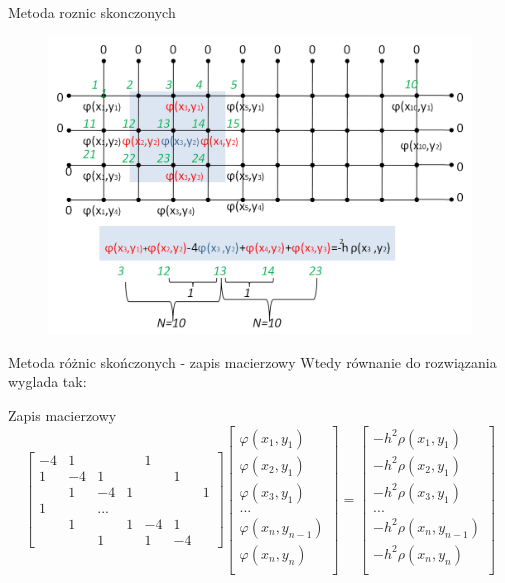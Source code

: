 \begin{frame}{Metoda roznic skonczonych}
  \begin{figure}
      \centering
      \includegraphics[width=\textwidth]{img/12/rozniczowe.png}
      \label{fig:my_label}
  \end{figure}  
\end{frame}
\begin{frame}{Metoda różnic skończonych - zapis macierzowy}
Wtedy równanie do rozwiązania wyglada tak:
	\begin{exampleblock}{Zapis macierzowy }
	{\scriptsize
	$$
	\begin{bmatrix}
	-4 & 1 &  &  & 1 &  & \\ 
	1&  -4 & 1 &  &  &1  & \\ 
	& 1 &  -4& 1 &  &  &1 \\ 
	1&  &  ...& &  &  & \\ 
	& 1 &  &  1 & -4 & 1 & \\ 
	&  & 1 &  & 1 &  -4 &
	\end{bmatrix}		
	\begin{bmatrix}
	\varphi(x_1,y_1) \\
	\varphi(x_2,y_1) \\
	\varphi(x_3,y_1) \\
	...\\
	\varphi(x_n,y_{n-1})\\
	\varphi(x_n, y_{n})\\
	\end{bmatrix}		
	= 		
	\begin{bmatrix} 
	-h^2\rho(x_1,y_1)  \\
	-h^2\rho(x_2,y_1)\\
	-h^2\rho(x_3,y_1)\\
	... \\
	-h^2\rho(x_n,y_{n-1})\\
	-h^2\rho(x_n, y_{n})\\
	\end{bmatrix}
	$$}
	\end{exampleblock}
\end{frame}
